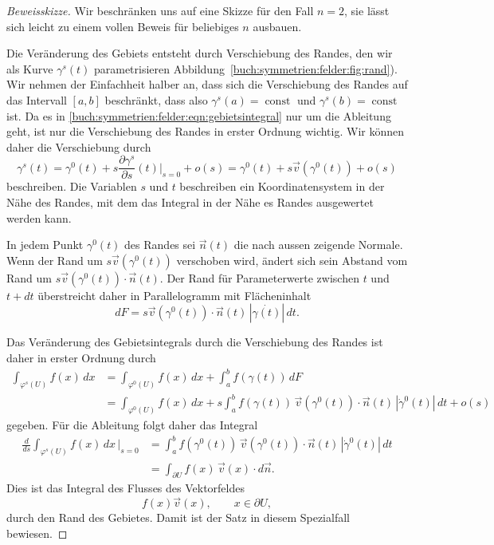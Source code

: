 \begin{proof}[Beweisskizze]
Wir beschränken uns auf eine Skizze für den Fall $n=2$, sie lässt
sich leicht zu einem vollen Beweis für beliebiges $n$ ausbauen.

Die Veränderung des Gebiets entsteht durch Verschiebung des Randes,
den wir als Kurve $\gamma^s(t)$ parametrisieren 
Abbildung~\ref{buch:symmetrien:felder:fig:rand}).
Wir nehmen der Einfachheit halber an, dass sich die Verschiebung des
Randes auf das Intervall $[a,b]$ beschränkt, dass also
$\gamma^s(a)=\operatorname{const}$
und
$\gamma^s(b)=\operatorname{const}$
ist.
Da es in \eqref{buch:symmetrien:felder:eqn:gebietsintegral}
nur um die Ableitung geht, ist nur die Verschiebung des Randes 
in erster Ordnung wichtig.
Wir können daher die Verschiebung durch
\[
\gamma^s(t) 
=
\gamma^0(t)
+
s \frac{\partial \gamma^s}{\partial s}(t) \bigg|_{s=0}
+ o(s)
=
\gamma^0(t)
+
s\vec{v}(\gamma^0(t))
+
o(s)
\]
beschreiben.
Die Variablen $s$ und $t$ beschreiben ein Koordinatensystem in der
Nähe des Randes, mit dem das Integral in der Nähe es Randes ausgewertet
werden kann.

In jedem Punkt $\gamma^0(t)$ des Randes sei $\vec{n}(t)$ die nach
aussen zeigende Normale.
Wenn der Rand um $s\vec{v}(\gamma^0(t))$ verschoben wird,
ändert sich sein Abstand vom Rand um 
$s\vec{v}(\gamma^0(t))\cdot \vec{n}(t)$.
Der Rand für Parameterwerte zwischen $t$ und $t+dt$ überstreicht
daher in Parallelogramm mit Flächeninhalt
\[
dF
=
s\vec{v}(\gamma^0(t))\cdot \vec{n}(t)
\,
|\dot{\gamma(t)}|
\,dt.
\]

Das Veränderung des Gebietsintegrals durch die Verschiebung des
Randes ist daher in erster Ordnung durch
\begin{align*}
\int_{\varphi^s(U)} f(x)\,dx
&=
\int_{\varphi^0(U)} f(x)\,dx
+
\int_a^b
f(\gamma(t))
\,dF
\\
&=
\int_{\varphi^0(U)} f(x)\,dx
+
s
\int_a^b
f(\gamma(t))
\,
\vec{v}(\gamma^0(t))
\cdot \vec{n}(t)
\,
|\dot{\gamma}^0(t)|
\,dt
+
o(s)
\end{align*}
gegeben.
Für die Ableitung folgt daher das Integral
\begin{align*}
\frac{d}{ds}
\int_{\varphi^s(U)} f(x)\,dx\,\bigg|_{s=0}
&=
\int_a^b
f(\gamma^0(t))
\,
\vec{v}(\gamma^0(t)) \cdot \vec{n}(t)
\,
|\dot{\gamma}^0(t)|\,dt
\\
&=
\int_{\partial U}
f(x)
\,
\vec{v}(x) \cdot
d\vec{n}.
\end{align*}
Dies ist das Integral des Flusses des Vektorfeldes 
\[
f(x)  \vec{v}(x),\qquad x\in\partial U,
\]
durch den Rand des Gebietes.
Damit ist der Satz in diesem Spezialfall bewiesen.
\end{proof}

